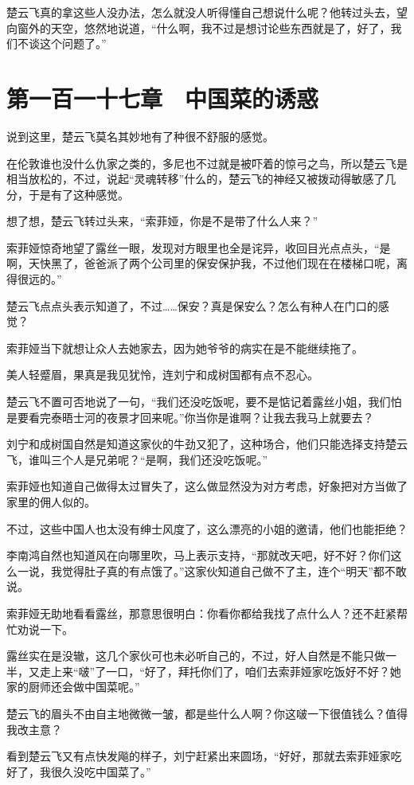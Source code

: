 楚云飞真的拿这些人没办法，怎么就没人听得懂自己想说什么呢？他转过头去，望向窗外的天空，悠然地说道，“什么啊，我不过是想讨论些东西就是了，好了，我们不谈这个问题了。”

\section{第一百一十七章　中国菜的诱惑}

说到这里，楚云飞莫名其妙地有了种很不舒服的感觉。

在伦敦谁也没什么仇家之类的，多尼也不过就是被吓着的惊弓之鸟，所以楚云飞是相当放松的，不过，说起“灵魂转移”什么的，楚云飞的神经又被拨动得敏感了几分，于是有了这种感觉。

想了想，楚云飞转过头来，“索菲娅，你是不是带了什么人来？”

索菲娅惊奇地望了露丝一眼，发现对方眼里也全是诧异，收回目光点点头，“是啊，天快黑了，爸爸派了两个公司里的保安保护我，不过他们现在在楼梯口呢，离得很远的。”

楚云飞点点头表示知道了，不过……保安？真是保安么？怎么有种人在门口的感觉？

索菲娅当下就想让众人去她家去，因为她爷爷的病实在是不能继续拖了。

美人轻蹙眉，果真是我见犹怜，连刘宁和成树国都有点不忍心。

楚云飞不置可否地说了一句，“我们还没吃饭呢，要不是惦记着露丝小姐，我们怕是要看完泰晤士河的夜景才回来呢。”你当你是谁啊？让我去我马上就要去？

刘宁和成树国自然是知道这家伙的牛劲又犯了，这种场合，他们只能选择支持楚云飞，谁叫三个人是兄弟呢？“是啊，我们还没吃饭呢。”

索菲娅也知道自己做得太过冒失了，这么做显然没为对方考虑，好象把对方当做了家里的佣人似的。

不过，这些中国人也太没有绅士风度了，这么漂亮的小姐的邀请，他们也能拒绝？

李南鸿自然也知道风在向哪里吹，马上表示支持，“那就改天吧，好不好？你们这么一说，我觉得肚子真的有点饿了。”这家伙知道自己做不了主，连个“明天”都不敢说。

索菲娅无助地看看露丝，那意思很明白：你看你都给我找了点什么人？还不赶紧帮忙劝说一下。

露丝实在是没辙，这几个家伙可也未必听自己的，不过，好人自然是不能只做一半，又走上来“啵”了一口，“好了，拜托你们了，咱们去索菲娅家吃饭好不好？她家的厨师还会做中国菜呢。”

楚云飞的眉头不由自主地微微一皱，都是些什么人啊？你这啵一下很值钱么？值得我改主意？

看到楚云飞又有点快发飚的样子，刘宁赶紧出来圆场，“好好，那就去索菲娅家吃好了，我很久没吃中国菜了。”

